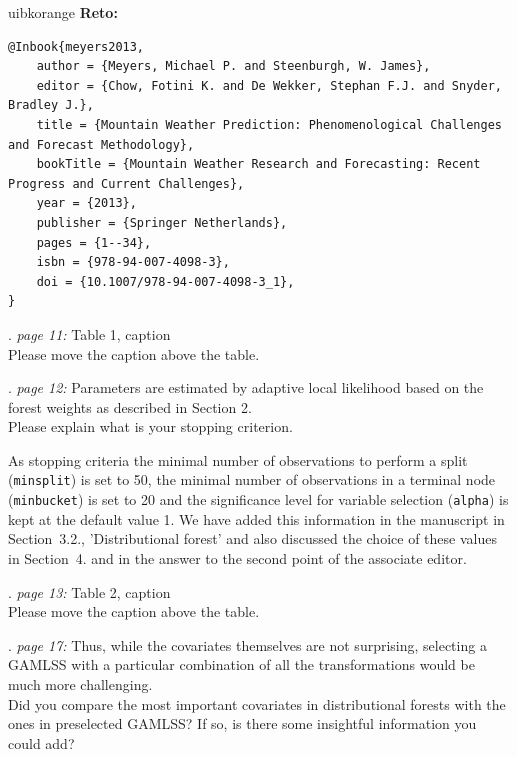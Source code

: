 \documentclass[american,foldmarks=false,noconfig]{uibklttr}
\newenvironment{review}{\fontshape{\itdefault}\fontseries{\bfdefault} \selectfont \smallskip}{\par}
\newenvironment{reto}{
    \begin{color}{uibkorange}
    \textbf{Reto:~}
        \itshape
}{
    \end{color}
}
\begin{document}
\begin{reto}
\begin{verbatim}
@Inbook{meyers2013,
    author = {Meyers, Michael P. and Steenburgh, W. James},
    editor = {Chow, Fotini K. and De Wekker, Stephan F.J. and Snyder, Bradley J.},
    title = {Mountain Weather Prediction: Phenomenological Challenges and Forecast Methodology},
    bookTitle = {Mountain Weather Research and Forecasting: Recent Progress and Current Challenges},
    year = {2013},
    publisher = {Springer Netherlands},
    pages = {1--34},
    isbn = {978-94-007-4098-3},
    doi = {10.1007/978-94-007-4098-3_1},
}
\end{verbatim}
\end{reto}


\begin{review}
12. {\color{quotecolor}\textit{page 11:} Table 1, caption}\\
Please move the caption above the table.
\end{review}


\begin{review}
13. {\color{quotecolor}\textit{page 12:} Parameters are estimated 
by adaptive local likelihood based on the forest weights as 
described in Section 2.}\\
Please explain what is your stopping criterion.
\end{review}

As stopping criteria the minimal number of observations to perform 
a split (\texttt{minsplit}) is set to 50,  the minimal number of 
observations in a terminal node (\texttt{minbucket}) is set to 20 
and the significance level for variable selection (\texttt{alpha}) 
is kept at the default value 1. We have added this information in 
the manuscript in Section~3.2., 'Distributional forest' and
also discussed the choice of these values in Section~4. and
in the answer to the second point of the associate editor.


\begin{review}
14. {\color{quotecolor}\textit{page 13:} Table 2, caption}\\
Please move the caption above the table.
\end{review}


\begin{review}
15. {\color{quotecolor}\textit{page 17:} Thus, while the covariates 
themselves are not surprising, selecting a GAMLSS with a particular 
combination of all the transformations would be much more challenging.}\\
Did you compare the most important covariates in distributional forests
with the ones in preselected GAMLSS? If so, is there some insightful
information you could add?
\end{review}
\end{document}
